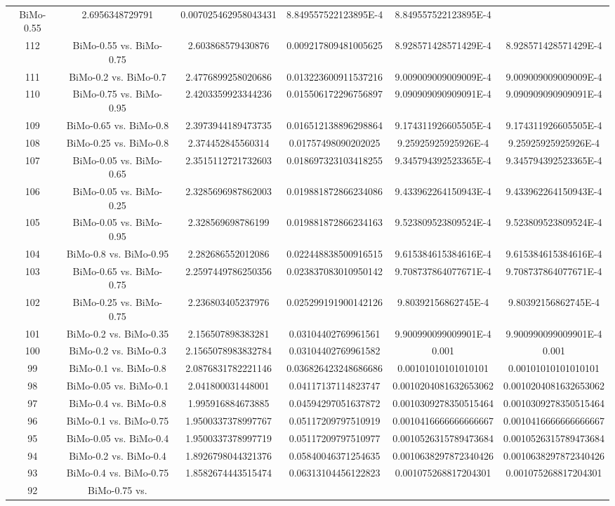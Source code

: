 \documentclass[a4paper,10pt]{article}
\begin{document}
\begin{landscape}
\begin{table}[!htp]
\begin{tabular}{cccccc}
BiMo-0.55&2.6956348729791&0.007025462958043431&8.849557522123895E-4&8.849557522123895E-4\\112&BiMo-0.55 vs. BiMo-0.75&2.603868579430876&0.009217809481005625&8.928571428571429E-4&8.928571428571429E-4\\111&BiMo-0.2 vs. BiMo-0.7&2.4776899258020686&0.013223600911537216&9.009009009009009E-4&9.009009009009009E-4\\110&BiMo-0.75 vs. BiMo-0.95&2.4203359923344236&0.015506172296756897&9.090909090909091E-4&9.090909090909091E-4\\109&BiMo-0.65 vs. BiMo-0.8&2.3973944189473735&0.016512138896298864&9.174311926605505E-4&9.174311926605505E-4\\108&BiMo-0.25 vs. BiMo-0.8&2.374452845560314&0.01757498090202025&9.25925925925926E-4&9.25925925925926E-4\\107&BiMo-0.05 vs. BiMo-0.65&2.3515112721732603&0.018697323103418255&9.345794392523365E-4&9.345794392523365E-4\\106&BiMo-0.05 vs. BiMo-0.25&2.3285696987862003&0.019881872866234086&9.433962264150943E-4&9.433962264150943E-4\\105&BiMo-0.05 vs. BiMo-0.95&2.328569698786199&0.019881872866234163&9.523809523809524E-4&9.523809523809524E-4\\104&BiMo-0.8 vs. BiMo-0.95&2.282686552012086&0.022448838500916515&9.615384615384616E-4&9.615384615384616E-4\\103&BiMo-0.65 vs. BiMo-0.75&2.2597449786250356&0.023837083010950142&9.708737864077671E-4&9.708737864077671E-4\\102&BiMo-0.25 vs. BiMo-0.75&2.236803405237976&0.025299191900142126&9.80392156862745E-4&9.80392156862745E-4\\101&BiMo-0.2 vs. BiMo-0.35&2.156507898383281&0.03104402769961561&9.900990099009901E-4&9.900990099009901E-4\\100&BiMo-0.2 vs. BiMo-0.3&2.1565078983832784&0.03104402769961582&0.001&0.001\\99&BiMo-0.1 vs. BiMo-0.8&2.0876831782221146&0.036826423248686686&0.00101010101010101&0.00101010101010101\\98&BiMo-0.05 vs. BiMo-0.1&2.041800031448001&0.04117137114823747&0.0010204081632653062&0.0010204081632653062\\97&BiMo-0.4 vs. BiMo-0.8&1.995916884673885&0.04594297051637872&0.0010309278350515464&0.0010309278350515464\\96&BiMo-0.1 vs. BiMo-0.75&1.9500337378997767&0.05117209797510919&0.0010416666666666667&0.0010416666666666667\\95&BiMo-0.05 vs. BiMo-0.4&1.9500337378997719&0.05117209797510977&0.0010526315789473684&0.0010526315789473684\\94&BiMo-0.2 vs. BiMo-0.4&1.8926798044321376&0.05840046371254635&0.0010638297872340426&0.0010638297872340426\\93&BiMo-0.4 vs. BiMo-0.75&1.8582674443515474&0.06313104456122823&0.001075268817204301&0.001075268817204301\\92&BiMo-0.75 vs. 
\end{tabular}
\end{table}
\end{landscape}
\end{document}
